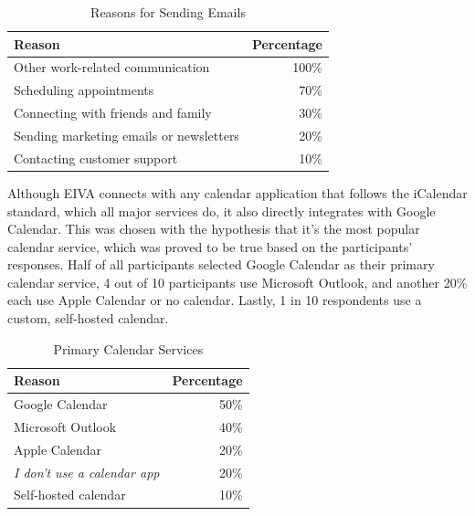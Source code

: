 \documentclass{article}
\begin{document}
\begin{table}[!htb]
	\begin{minipage}{1\linewidth}
		\caption{Reasons for Sending Emails}
		\centering
		\begin{tabular}{lr}
			\hline
			\textbf{Reason}                         & \textbf{Percentage} \\
			\hline
			Other work-related communication        & 100\%               \\
			Scheduling appointments                 & 70\%                \\
			Connecting with friends and family      & 30\%                \\
			Sending marketing emails or newsletters & 20\%                \\
			Contacting customer support             & 10\%                \\
			\hline
		\end{tabular}
	\end{minipage}%
\end{table}

Although EIVA connects with any calendar application that follows the iCalendar standard, which all major services do, it also directly integrates with Google Calendar. This was chosen with the hypothesis that it's the most popular calendar service, which was proved to be true based on the participants' responses. Half of all participants selected Google Calendar as their primary calendar service, 4 out of 10 participants use Microsoft Outlook, and another 20\% each use Apple Calendar or no calendar. Lastly, 1 in 10 respondents use a custom, self-hosted calendar.

\begin{table}[!htb]
	\begin{minipage}{1\linewidth}
		\caption{Primary Calendar Services}
		\centering
		\begin{tabular}{lr}
			\hline
			\textbf{Reason}                   & \textbf{Percentage} \\
			\hline
			Google Calendar                   & 50\%                \\
			Microsoft Outlook                 & 40\%                \\
			Apple Calendar                    & 20\%                \\
			\emph{I don't use a calendar app} & 20\%                \\
			Self-hosted calendar              & 10\%                \\
			\hline
		\end{tabular}
	\end{minipage}%
\end{table}
\end{document}
